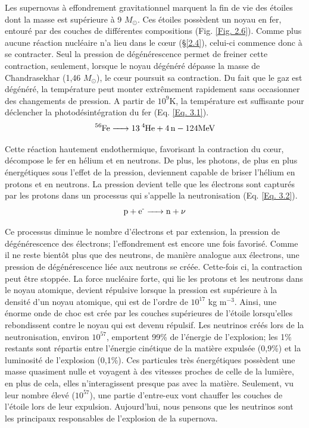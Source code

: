 Les supernovas à effondrement gravitationnel marquent la fin de vie des étoiles dont la masse est supérieure à 9 $M_\odot$. Ces étoiles possèdent un noyau en fer, entouré par des couches de différentes compositions (Fig. \ref{Fig. 2.6}). Comme plus aucune réaction nucléaire n'a lieu dans le cœur (§\ref{2.4}), celui-ci commence donc à se contracter. Seul la pression de dégénérescence permet de freiner cette contraction, seulement, lorsque le noyau dégénéré dépasse la masse de Chandrasekhar (1,46 $M_\odot$), le cœur poursuit sa contraction. Du fait que le gaz est dégénéré, la température peut monter extrêmement rapidement sans occasionner des changements de pression. A partir de $10^{9}$K, la température est suffisante pour déclencher la photodésintégration du fer (Eq.  \ref{Eq. 3.1}).\begin{equation} \ce{\ce{^{56}Fe} -> \ce{13\ce{^{4}He}} + \ce{4n} - {124MeV}}\label{Eq. 3.1}\end{equation}

Cette réaction hautement endothermique, favorisant la contraction du cœur, décompose le fer en hélium et en neutrons. De plus, les photons, de plus en plus énergétiques sous l'effet de la pression, deviennent capable de briser l'hélium en protons et en neutrons. La pression devient telle que les électrons sont capturés par les protons dans un processus qui s'appelle la neutronisation (Eq. \ref{Eq. 3.2}).\begin{equation} \ce{p + e{^-} -> n + $\nu$\label{Eq. 3.2}}\end{equation}

Ce processus diminue le nombre d'électrons et par extension, la pression de dégénérescence des électrons; l'effondrement est encore une fois favorisé. Comme il ne reste bientôt plus que des neutrons, de manière analogue aux électrons, une pression de dégénérescence liée aux neutrons se créée. Cette-fois ci, la contraction  peut être stoppée. La force nucléaire forte, qui lie les protons et les neutrons dans le noyau atomique, devient répulsive lorsque la pression est supérieure à la densité d'un noyau atomique, qui est de l'ordre de $10^{17}$ kg  m$^{-3}$. Ainsi, une énorme onde de choc est crée par les couches supérieures de l'étoile lorsqu'elles rebondissent contre le noyau qui est devenu répulsif.
Les neutrinos créés lors de la neutronisation, environ $10^{57}$, emportent 99\% de l'énergie de l'explosion; les 1\% restants sont répartis entre l'énergie cinétique de la matière expulsée (0,9\%) et la luminosité de l'explosion (0,1\%). Ces particules très énergétiques possèdent une masse quasiment nulle et voyagent à des vitesses proches de celle de la lumière, en plus de cela, elles n'interagissent presque pas avec la matière. Seulement, vu leur nombre élevé ($10^{57}$), une partie d'entre-eux vont chauffer les couches de l'étoile lors de leur expulsion. Aujourd'hui, nous pensons que les neutrinos sont les principaux responsables de l'explosion de la supernova.\smallskip


